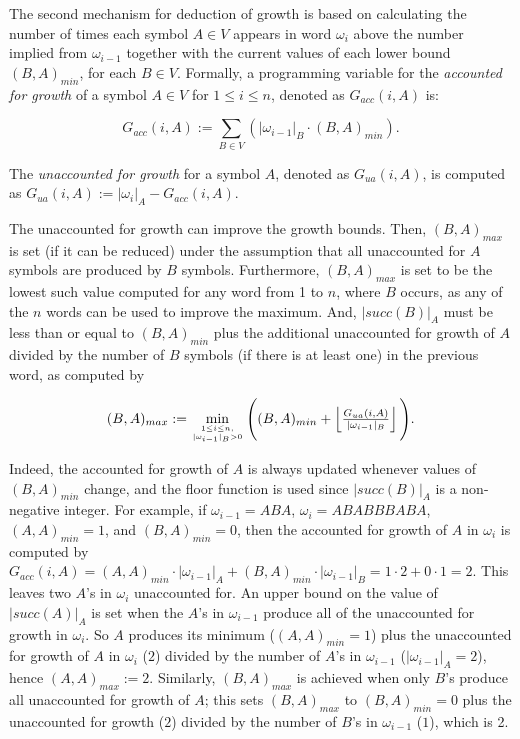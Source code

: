 \documentclass{llncs}
\begin{document}
	The second mechanism for deduction of growth is based on calculating the number of times each symbol $A \in V$ appears in word $\omega_{i}$ above the number implied from $\omega_{i-1}$ together with the current values of each lower bound $(B,A)_{min}$, for each $B \in V$. Formally, a programming variable for the \textit{accounted for growth} of a symbol $A \in V$ for $1 \leq i \leq n$, denoted as $G_{acc}(i,A)$ is:
	
	\begin{equation}
	G_{acc}(i,A) := \sum_{B \in V} (|\omega_{i-1}|_{B} \cdot (B,A)_{min}).
	\label{eq:1}
	\end{equation}
	
	\noindent The \textit{unaccounted for growth} for a symbol $A$, denoted as $G_{ua}(i,A)$, is computed as $G_{ua}(i,A) := |\omega_{i}|_{A} - G_{acc}(i,A)$. 
	
	The unaccounted for growth can improve the growth bounds. Then, $(B,A)_{max}$ is set (if it can be reduced) under the assumption that all unaccounted for $A$ symbols are produced by $B$ symbols. Furthermore, $(B,A)_{max}$ is set to be the lowest such value computed for any word from 1 to $n$, where $B$ occurs, as any of the $n$ words can be used to improve the maximum. And, $|succ(B)|_{A}$ must be less than or equal to $(B,A)_{min}$ plus the additional unaccounted for growth of $A$ divided by the number of $B$ symbols (if there is at least one) in the previous word, as computed by
	
	\begin{equation}
	(B,A)_{max} := \min_{1 \leq i \leq n, \atop |\omega_{i-1}|_{B} > 0} \Bigg((B,A)_{min} + \left \lfloor \tfrac{G_{ua}(i,A)} {|\omega_{i-1}|_{B}} \right \rfloor \Bigg).
	\label{eq:2}
	\end{equation}
	
	\noindent Indeed, the accounted for growth of $A$ is always updated whenever values of $(B,A)_{min}$ change, and the floor function is used since $|succ(B)|_{A}$ is a non-negative integer. For example, if $\omega_{i-1} = ABA$, $\omega_{i} = ABABBBABA$, $(A,A)_{min} = 1$, and $(B,A)_{min} = 0$, then the accounted for growth of $A$ in $\omega_{i}$ is computed by $G_{acc}(i,A) = (A,A)_{min} \cdot |\omega_{i-1}|_{A} + (B,A)_{min} \cdot |\omega_{i-1}|_{B} = 1 \cdot 2 + 0 \cdot 1 = 2$. This leaves two $A$'s in $\omega_{i}$ unaccounted for. An upper bound on the value of $|succ(A)|_{A}$ is set when the $A$'s in $\omega_{i-1}$ produce all of the unaccounted for growth in $\omega_{i}$. So $A$ produces its minimum ($(A,A)_{min} = 1$) plus the unaccounted for growth of $A$ in $\omega_{i}$ ($2$) divided by the number of $A$'s in $\omega_{i-1}$ ($|\omega_{i-1}|_{A} = 2$), hence $(A,A)_{max} := 2$. Similarly, $(B,A)_{max}$ is achieved when only $B$'s produce all unaccounted for growth of $A$; this sets $(B,A)_{max}$ to $(B,A)_{min} = 0$ plus the unaccounted for growth ($2$) divided by the number of $B$'s in $\omega_{i-1}$ ($1$), which is 2.
	
\end{document}
